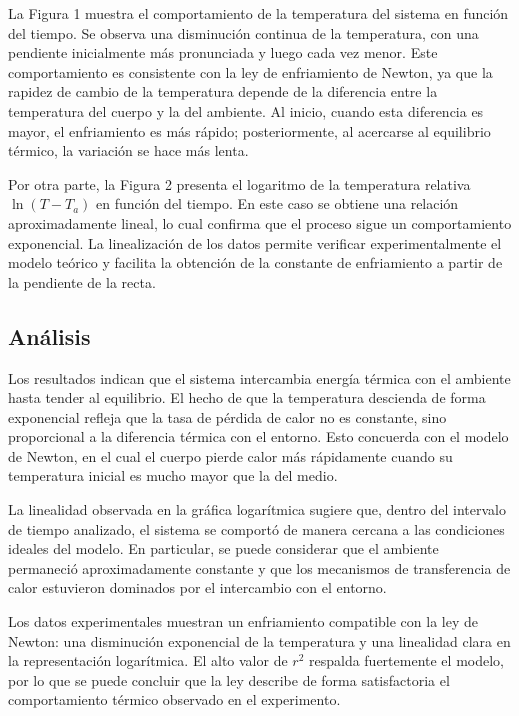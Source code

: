 La Figura 1 muestra el comportamiento de la temperatura del sistema en función del tiempo. Se observa una disminución continua de la temperatura, con una pendiente inicialmente más pronunciada y luego cada vez menor. Este comportamiento es consistente con la ley de enfriamiento de Newton, ya que la rapidez de cambio de la temperatura depende de la diferencia entre la temperatura del cuerpo y la del ambiente. Al inicio, cuando esta diferencia es mayor, el enfriamiento es más rápido; posteriormente, al acercarse al equilibrio térmico, la variación se hace más lenta.

Por otra parte, la Figura 2 presenta el logaritmo de la temperatura relativa \(\ln(T-T_a)\) en función del tiempo. En este caso se obtiene una relación aproximadamente lineal, lo cual confirma que el proceso sigue un comportamiento exponencial. La linealización de los datos permite verificar experimentalmente el modelo teórico y facilita la obtención de la constante de enfriamiento a partir de la pendiente de la recta.

\subsection{Análisis}

Los resultados indican que el sistema intercambia energía térmica con el ambiente hasta tender al equilibrio. El hecho de que la temperatura descienda de forma exponencial refleja que la tasa de pérdida de calor no es constante, sino proporcional a la diferencia térmica con el entorno. Esto concuerda con el modelo de Newton, en el cual el cuerpo pierde calor más rápidamente cuando su temperatura inicial es mucho mayor que la del medio.

La linealidad observada en la gráfica logarítmica sugiere que, dentro del intervalo de tiempo analizado, el sistema se comportó de manera cercana a las condiciones ideales del modelo. En particular, se puede considerar que el ambiente permaneció aproximadamente constante y que los mecanismos de transferencia de calor estuvieron dominados por el intercambio con el entorno.

Los datos experimentales muestran un enfriamiento compatible con la ley de Newton: una disminución exponencial de la temperatura y una linealidad clara en la representación logarítmica. El alto valor de \(r^2\) respalda fuertemente el modelo, por lo que se puede concluir que la ley describe de forma satisfactoria el comportamiento térmico observado en el experimento.

